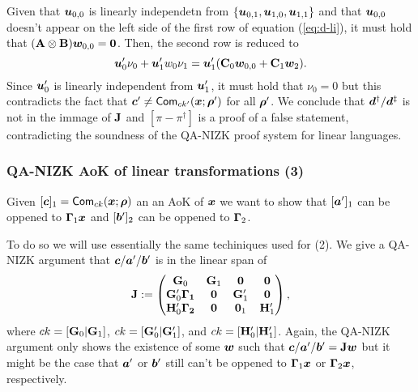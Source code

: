 Given that ${\boldsymbol{u}}_{0,0}$ is linearly independetn from $\{{\boldsymbol{u}}_{0,1},{\boldsymbol{u}}_{1,0},{\boldsymbol{u}}_{1,1}\}$ and that ${\boldsymbol{u}}_{0,0}$ doesn't appear on the left side of the first row of equation (\ref{eq:d-li}), it must hold that $(\mathbf{{A}}\otimes\mathbf{{B}}){\boldsymbol{w}}_{0,0}={\boldsymbol{0}}$. Then, the second row is reduced to
$$
{\boldsymbol{u}}'_{0}\nu_{0} + {\boldsymbol{u}}'_1w_0\nu_1 = {\boldsymbol{u}}'_1(\mathbf{{C}}_0{\boldsymbol{w}}_{0,0}+\mathbf{{C}}_1{\boldsymbol{w}}_2).
$$
Since ${\boldsymbol{u}}'_0$ is linearly independent from ${\boldsymbol{u}}'_1$, it must hold that $\nu_0=0$ but this contradicts the fact that ${\boldsymbol{c}}'\neq\mathsf{Com}_{ck'}({\boldsymbol{x}};{\boldsymbol{\rho}}')$ for all ${\boldsymbol{\rho}}'$. We conclude that ${\boldsymbol{d}}^\dag/{\boldsymbol{d}}^\ddag$ is not in the immage of $\mathbf{{J}}$ and $[\pi-\pi^\dag]$ is a proof of a false statement, contradicting the soundness of the QA-NIZK proof system for linear languages.

\subsubsection{QA-NIZK AoK of linear transformations (3)}
Given $[{\boldsymbol{c}}]_1=\mathsf{Com}_{ck}({\boldsymbol{x}};{\boldsymbol{\rho}})$ an an AoK of ${\boldsymbol{x}}$ we want to show that $[{\boldsymbol{a}}']_1$ can be oppened to $\mathbf{{\Gamma}}_1{\boldsymbol{x}}$ and $[{\boldsymbol{b}}']_2$ can be oppened to $\mathbf{{\Gamma}}_2$.

To do so we will use essentially the same techiniques used for (2). We give a QA-NIZK argument that ${\boldsymbol{c}}/{\boldsymbol{a}}'/{\boldsymbol{b}}'$ is in the linear span of
$$
\mathbf{{J}}:=
\begin{pmatrix}
\mathbf{{G}}_0                              & \mathbf{{G}}_1 & \mathbf{{0}}      & \mathbf{{0}} \\
\mathbf{{G}}'_0\mathbf{{\Gamma_1}}& \mathbf{{0}}     & \mathbf{{G}}'_1 & \mathbf{{0}} \\
\mathbf{{H}}'_0\mathbf{{\Gamma_2}}& \mathbf{{0}}    & \mathbf{{0}}_1   & \mathbf{{H}}'_1 
\end{pmatrix},
$$
where $ck=[\mathbf{{G}}_0|\mathbf{{G}}_1]$, $ck=[\mathbf{{G}}'_0|\mathbf{{G}}'_1]$, and $ck=[\mathbf{{H}}'_0|\mathbf{{H}}'_1]$.
Again, the QA-NIZK argument only shows the existence of some ${\boldsymbol{w}}$ such that ${\boldsymbol{c}}/{\boldsymbol{a}}'/{\boldsymbol{b}}' = \mathbf{{J}}{\boldsymbol{w}}$ but it might be the case that ${\boldsymbol{a}}'$ or ${\boldsymbol{b}}'$ still can't be oppened to $\mathbf{{\Gamma}}_1{\boldsymbol{x}}$ or  $\mathbf{{\Gamma}}_2{\boldsymbol{x}}$, respectively.


